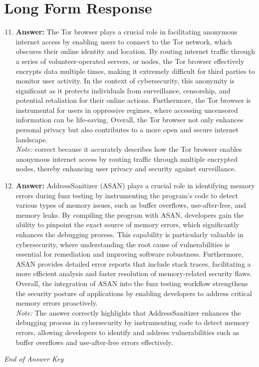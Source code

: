 \documentclass[12pt]{article}
\begin{document}
\section*{Long Form Response}
\begin{enumerate}[label=\arabic*.]
\setcounter{enumi}{10}
\item \textbf{Answer:} The Tor browser plays a crucial role in facilitating anonymous internet access by enabling users to connect to the Tor network, which obscures their online identity and location. By routing internet traffic through a series of volunteer-operated servers, or nodes, the Tor browser effectively encrypts data multiple times, making it extremely difficult for third parties to monitor user activity. In the context of cybersecurity, this anonymity is significant as it protects individuals from surveillance, censorship, and potential retaliation for their online actions. Furthermore, the Tor browser is instrumental for users in oppressive regimes, where accessing uncensored information can be life-saving. Overall, the Tor browser not only enhances personal privacy but also contributes to a more open and secure internet landscape.
\\ \textit{Note:} correct because it accurately describes how the Tor browser enables anonymous internet access by routing traffic through multiple encrypted nodes, thereby enhancing user privacy and security against surveillance.
\item \textbf{Answer:} AddressSanitizer (ASAN) plays a crucial role in identifying memory errors during fuzz testing by instrumenting the program's code to detect various types of memory issues, such as buffer overflows, use-after-free, and memory leaks. By compiling the program with ASAN, developers gain the ability to pinpoint the exact source of memory errors, which significantly enhances the debugging process. This capability is particularly valuable in cybersecurity, where understanding the root cause of vulnerabilities is essential for remediation and improving software robustness. Furthermore, ASAN provides detailed error reports that include stack traces, facilitating a more efficient analysis and faster resolution of memory-related security flaws. Overall, the integration of ASAN into the fuzz testing workflow strengthens the security posture of applications by enabling developers to address critical memory errors proactively.
\\ \textit{Note:} The answer correctly highlights that AddressSanitizer enhances the debugging process in cybersecurity by instrumenting code to detect memory errors, allowing developers to identify and address vulnerabilities such as buffer overflows and use-after-free errors effectively.
\end{enumerate}

\vfill
\noindent\textit{End of Answer Key}
\end{document}
